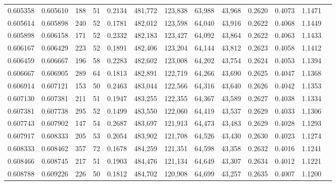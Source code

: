 \begin{tabular}{rrrrrrrrrrrrr}
0.605358 & 0.605610 &    188 &    51 &                                     0.2134 & 481,772 & 123,838 &  63,988 &  43,968 & 0.2620 & 0.4073 & 1.1471 \\
0.605614 & 0.605898 &    240 &    52 &                                     0.1781 & 482,012 & 123,598 &  64,040 &  43,916 & 0.2622 & 0.4068 & 1.1449 \\
0.605898 & 0.606158 &    171 &    52 &                                     0.2332 & 482,183 & 123,427 &  64,092 &  43,864 & 0.2622 & 0.4063 & 1.1433 \\
0.606167 & 0.606429 &    223 &    52 &                                     0.1891 & 482,406 & 123,204 &  64,144 &  43,812 & 0.2623 & 0.4058 & 1.1412 \\
0.606459 & 0.606667 &    196 &    58 &                                     0.2283 & 482,602 & 123,008 &  64,202 &  43,754 & 0.2624 & 0.4053 & 1.1394 \\
0.606667 & 0.606905 &    289 &    64 &                                     0.1813 & 482,891 & 122,719 &  64,266 &  43,690 & 0.2625 & 0.4047 & 1.1368 \\
0.606914 & 0.607121 &    153 &    50 &                                     0.2463 & 483,044 & 122,566 &  64,316 &  43,640 & 0.2626 & 0.4042 & 1.1353 \\
0.607130 & 0.607381 &    211 &    51 &                                     0.1947 & 483,255 & 122,355 &  64,367 &  43,589 & 0.2627 & 0.4038 & 1.1334 \\
0.607381 & 0.607738 &    295 &    52 &                                     0.1499 & 483,550 & 122,060 &  64,419 &  43,537 & 0.2629 & 0.4033 & 1.1306 \\
0.607743 & 0.607902 &    147 &    54 &                                     0.2687 & 483,697 & 121,913 &  64,473 &  43,483 & 0.2629 & 0.4028 & 1.1293 \\
0.607917 & 0.608333 &    205 &    53 &                                     0.2054 & 483,902 & 121,708 &  64,526 &  43,430 & 0.2630 & 0.4023 & 1.1274 \\
0.608333 & 0.608462 &    357 &    72 &                                     0.1678 & 484,259 & 121,351 &  64,598 &  43,358 & 0.2632 & 0.4016 & 1.1241 \\
0.608466 & 0.608745 &    217 &    51 &                                     0.1903 & 484,476 & 121,134 &  64,649 &  43,307 & 0.2634 & 0.4012 & 1.1221 \\
0.608788 & 0.609226 &    226 &    50 &                                     0.1812 & 484,702 & 120,908 &  64,699 &  43,257 & 0.2635 & 0.4007 & 1.1200 \\

\end{tabular}
